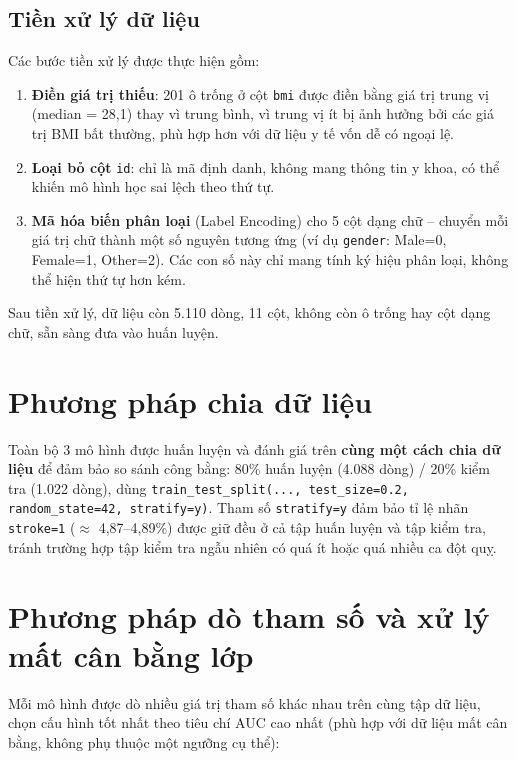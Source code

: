 \documentclass[12pt,a4paper]{report}
\begin{document}
\subsection{Tiền xử lý dữ liệu}

Các bước tiền xử lý được thực hiện gồm:
\begin{enumerate}
    \item \textbf{Điền giá trị thiếu}: 201 ô trống ở cột \texttt{bmi} được điền bằng giá trị trung vị (median = 28,1) thay vì trung bình, vì trung vị ít bị ảnh hưởng bởi các giá trị BMI bất thường, phù hợp hơn với dữ liệu y tế vốn dễ có ngoại lệ.
    \item \textbf{Loại bỏ cột} \texttt{id}: chỉ là mã định danh, không mang thông tin y khoa, có thể khiến mô hình học sai lệch theo thứ tự.
    \item \textbf{Mã hóa biến phân loại} (Label Encoding) cho 5 cột dạng chữ -- chuyển mỗi giá trị chữ thành một số nguyên tương ứng (ví dụ \texttt{gender}: Male=0, Female=1, Other=2). Các con số này chỉ mang tính ký hiệu phân loại, không thể hiện thứ tự hơn kém.
\end{enumerate}

Sau tiền xử lý, dữ liệu còn 5.110 dòng, 11 cột, không còn ô trống hay cột dạng chữ, sẵn sàng đưa vào huấn luyện.

\section{Phương pháp chia dữ liệu}

Toàn bộ 3 mô hình được huấn luyện và đánh giá trên \textbf{cùng một cách chia dữ liệu} để đảm bảo so sánh công bằng: 80\% huấn luyện (4.088 dòng) / 20\% kiểm tra (1.022 dòng), dùng \texttt{train\_test\_split(..., test\_size=0.2, random\_state=42, stratify=y)}. Tham số \texttt{stratify=y} đảm bảo tỉ lệ nhãn \texttt{stroke=1} ($\approx$ 4,87--4,89\%) được giữ đều ở cả tập huấn luyện và tập kiểm tra, tránh trường hợp tập kiểm tra ngẫu nhiên có quá ít hoặc quá nhiều ca đột quỵ.

\section{Phương pháp dò tham số và xử lý mất cân bằng lớp}

Mỗi mô hình được dò nhiều giá trị tham số khác nhau trên cùng tập dữ liệu, chọn cấu hình tốt nhất theo tiêu chí AUC cao nhất (phù hợp với dữ liệu mất cân bằng, không phụ thuộc một ngưỡng cụ thể):
\end{document}
